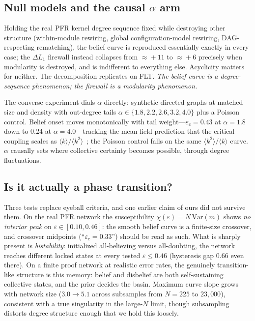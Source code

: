 \documentclass[11pt]{article}
\newcommand{\eps}{\varepsilon}
\newcommand{\kk}{\langle k^{2}\rangle/\langle k\rangle}
\begin{document}
\subsection{Null models and the causal $\alpha$ arm}

Holding the real PFR kernel degree sequence fixed while destroying other structure
(within-module rewiring, global configuration-model rewiring, DAG-respecting rematching), the
belief curve is reproduced essentially exactly in every case; the $\Delta L_1$ firewall instead
collapses from $\approx\!+11$ to $\approx\!+6$ precisely when modularity is destroyed, and is
indifferent to everything else. Acyclicity matters for neither. The decomposition replicates on
FLT. \emph{The belief curve is a degree-sequence phenomenon; the firewall is a modularity
phenomenon.}

The converse experiment dials $\alpha$ directly: synthetic directed graphs at matched size and
density with out-degree tails $\alpha \in \{1.8, 2.2, 2.6, 3.2, 4.0\}$ plus a Poisson control.
Belief onset moves monotonically with tail weight---$\eps_c = 0.43$ at $\alpha = 1.8$ down to
$0.24$ at $\alpha = 4.0$---tracking the mean-field prediction that the critical coupling scales
as $\langle k \rangle / \langle k^2 \rangle$~\cite{dorogovtsev2002}; the Poisson control falls
on the same $\kk$ curve. $\alpha$ causally sets where collective certainty becomes possible,
through degree fluctuations.

\subsection{Is it actually a phase transition?}
\label{sec:transition}

Three tests replace eyeball criteria, and one earlier claim of ours did not survive them. On
the real PFR network the susceptibility $\chi(\eps) = N \,\mathrm{Var}(m)$ shows \emph{no
interior peak} on $\eps \in [0.10, 0.46]$: the smooth belief curve is a finite-size crossover,
and crossover midpoints (``$\eps_c = 0.33$'') should be read as such. What is sharply present is
\emph{bistability}: initialized all-believing versus all-doubting, the network reaches different
locked states at every tested $\eps \le 0.46$ (hysteresis gap $0.66$ even there). On a finite
proof network at realistic error rates, the genuinely transition-like structure is this memory:
belief and disbelief are both self-sustaining collective states, and the prior decides the
basin. Maximum curve slope grows with network size ($3.0 \to 5.1$ across subsamples from
$N = 225$ to $23{,}000$), consistent with a true singularity in the large-$N$ limit, though
subsampling distorts degree structure enough that we hold this loosely.
\end{document}
